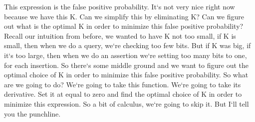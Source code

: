 This expression is the false positive probability.
It`s not very nice right now because we have this K\@.
Can we simplify this by eliminating K? Can we figure out what is the optimal K in order to minimize this false positive probability? Recall our intuition from before, we wanted to have K not too small, if K is small, then when we do a query, we`re checking too few bits.
But if K was big, if it`s too large, then when we do an assertion we`re setting too many bits to one, for each insertion.
So there`s some middle ground and we want to figure out the optimal choice of K in order to minimize this false positive probability.
So what are we going to do? We`re going to take this function.
We`re going to take its derivative.
Set it at equal to zero and find the optimal choice of K in order to minimize this expression.
So a bit of calculus, we`re going to skip it.
But I`ll tell you the punchline.

